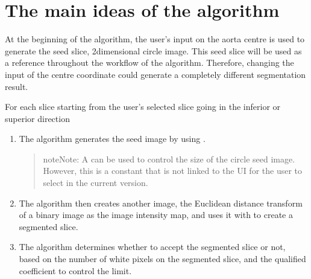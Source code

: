 \documentclass[letterpaper,10pt,english]{sphinxmanual}
\begin{document}
\chapter{The main ideas of the algorithm}
\label{\detokenize{index:the-main-ideas-of-the-algorithm}}
\sphinxAtStartPar
At the beginning of the algorithm, the user’s input on the aorta centre is used to generate the seed slice, 2\sphinxhyphen{}dimensional circle image. This seed slice will be used as a reference throughout the workflow of the algorithm. Therefore, changing the input of the centre coordinate could generate a completely different segmentation result.

\sphinxAtStartPar
For each slice starting from the user’s selected slice going in the inferior or superior direction
\begin{enumerate}
%
\item {} 
\sphinxAtStartPar
The algorithm generates the seed image by using .
\begin{quote}

\begin{sphinxadmonition}{note}{Note:}
\sphinxAtStartPar
A {\hyperref[\detokenize{glossary:term-Label-Statistic-coefficient}]{}} can be used to control the size of the circle seed image. However, this is a constant that is not linked to the UI for the user to select in the current version.
\end{sphinxadmonition}
\end{quote}

\item {} 
\sphinxAtStartPar
The algorithm then creates another image, the Euclidean distance transform of a binary image as the image intensity map, and uses it with  to create a segmented slice.

\item {} 
\sphinxAtStartPar
The algorithm determines whether to accept the segmented slice or not, based on the number of white pixels on the segmented slice, and the qualified coefficient to control the limit.
\begin{quote}


\end{quote}
\end{enumerate}
\end{document}
